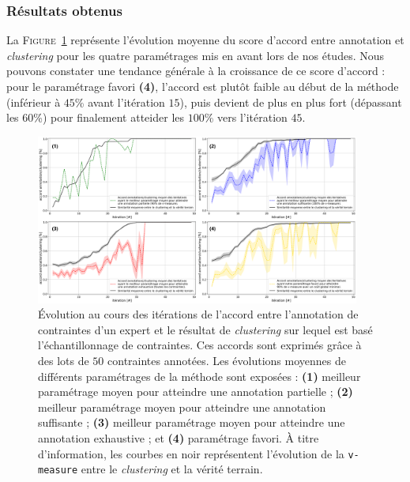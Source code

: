 		\subsubsection{Résultats obtenus}
			
			La \textsc{Figure~\ref{figure:4.5.1-ETUDE-RENTABILITE-ACCORD-ANNOTATION-CLUSTERING}} représente l'évolution moyenne du score d'accord entre annotation et \textit{clustering} pour les quatre paramétrages mis en avant lors de nos études.
			Nous pouvons constater une tendance générale à la croissance de ce score d'accord : pour le paramétrage favori \textbf{(4)}, l'accord est plutôt faible au début de la méthode (inférieur à $45$\% avant l'itération $15$), puis devient de plus en plus fort (dépassant les $60$\%) pour finalement atteider les $100$\% vers l'itération $45$.
			\begin{figure}[!htb]
				\centering
				\includegraphics[width=0.95\textwidth]{figures/etude-rentabilite-accord-annotation}
				\caption{
					Évolution au cours des itérations de l'accord entre l'annotation de contraintes d'un expert et le résultat de \textit{clustering} sur lequel est basé l'échantillonnage de contraintes.
					Ces accords sont exprimés grâce à des lots de $50$ contraintes annotées.
					Les évolutions moyennes de différents paramétrages de la méthode sont exposées :
					\textbf{(1)} meilleur paramétrage moyen pour atteindre une annotation partielle ;
					\textbf{(2)} meilleur paramétrage moyen pour atteindre une annotation suffisante ;
					\textbf{(3)} meilleur paramétrage moyen pour atteindre une annotation exhaustive ;
					et \textbf{(4)} paramétrage favori.
					À titre d'information, les courbes en noir représentent l'évolution de la \texttt{v-measure} entre le \textit{clustering} et la vérité terrain.
				} 
				\label{figure:4.5.1-ETUDE-RENTABILITE-ACCORD-ANNOTATION-CLUSTERING}
			\end{figure}
			
